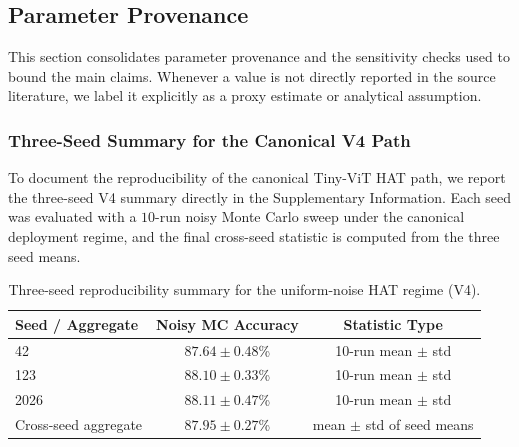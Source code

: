 \subsection{Parameter Provenance}
\label{subsec:parameter-provenance}

This section consolidates parameter provenance and the sensitivity checks used to bound the main claims. Whenever a value is not directly reported in the source literature, we label it explicitly as a proxy estimate or analytical assumption.

\subsubsection{Three-Seed Summary for the Canonical V4 Path}

To document the reproducibility of the canonical Tiny-ViT HAT path, we report the three-seed V4 summary directly in the Supplementary Information. Each seed was evaluated with a \(10\)-run noisy Monte Carlo sweep under the canonical deployment regime, and the final cross-seed statistic is computed from the three seed means.

\begin{table}[ht]
\centering
\caption{Three-seed reproducibility summary for the uniform-noise HAT regime (V4).}
\label{tab:v4-three-seed-summary}
\begin{tabular}{lcc}
\toprule
\textbf{Seed / Aggregate} & \textbf{Noisy MC Accuracy} & \textbf{Statistic Type} \\
\midrule
42 & \(87.64\pm0.48\)\% & 10-run mean \(\pm\) std \\
123 & \(88.10\pm0.33\)\% & 10-run mean \(\pm\) std \\
2026 & \(88.11\pm0.47\)\% & 10-run mean \(\pm\) std \\
\midrule
Cross-seed aggregate & \(\mathbf{87.95\pm0.27}\)\% & mean \(\pm\) std of seed means \\
\bottomrule
\end{tabular}
\end{table}

\FloatBarrier

